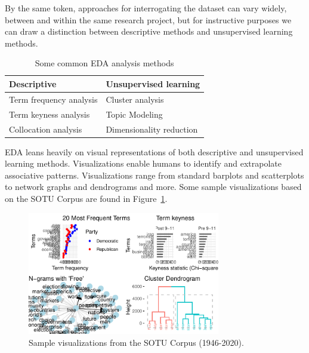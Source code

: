 \documentclass[
  letterpaper,
]{latex/krantz}
\begin{document}
By the same token, approaches for interrogating the dataset can vary
widely, between and within the same research project, but for
instructive purposes we can draw a distinction between descriptive
methods and unsupervised learning methods.

\hypertarget{tbl-eda-approaches-table}{}
\begin{table}
\caption{\label{tbl-eda-approaches-table}Some common EDA analysis methods }\tabularnewline

\centering
\begin{tabular}{ll}
\toprule
Descriptive & Unsupervised learning\\
\midrule
Term frequency analysis & Cluster analysis\\
Term keyness analysis & Topic Modeling\\
Collocation analysis & Dimensionality reduction\\
\bottomrule
\end{tabular}
\end{table}

EDA leans heavily on visual representations of both descriptive and
unsupervised learning methods. Visualizations enable humans to identify
and extrapolate associative patterns. Visualizations range from standard
barplots and scatterplots to network graphs and dendrograms and more.
Some sample visualizations based on the SOTU Corpus are found in
Figure~\ref{fig-eda-visualizations-grid}.

\begin{figure}[h]

{\centering \includegraphics[width=0.75\textwidth,height=\textheight]{approaching-analysis_files/figure-pdf/fig-eda-visualizations-grid-1.pdf}

}

\caption{\label{fig-eda-visualizations-grid}Sample visualizations from
the SOTU Corpus (1946-2020).}

\end{figure}
\end{document}
